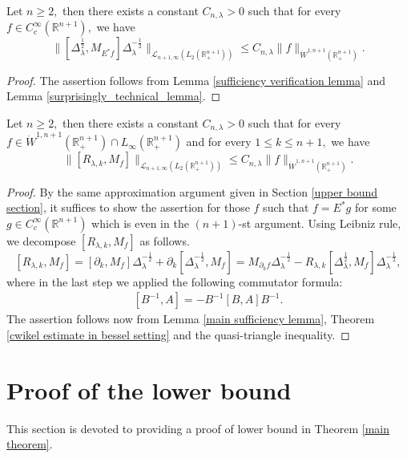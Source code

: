 \documentclass[12pt]{amsart}
\begin{document}
\begin{lemma}\label{main sufficiency lemma} Let $n\geq 2,$ then there exists a constant $C_{n,\lambda}>0$ such that for every $f\in C^{\infty}_c(\mathbb{R}^{n+1}),$ we have
$$\|[\Delta_\lambda^{\frac12},M_{E^*f}]\Delta_\lambda^{-\frac12}\|_{\mathcal{L}_{n+1,\infty}(L_2(\mathbb{R}_+^{n+1}))}\leq C_{n,\lambda}\|f\|_{\dot{W}^{1,n+1}(\mathbb{R}_+^{n+1})}.$$
\end{lemma}
\begin{proof} The assertion follows from Lemma \ref{sufficiency verification lemma} and Lemma \ref{surprisingly_technical_lemma}.
\end{proof}


\begin{proposition}\label{final sufficiency lemma} Let $n\geq 2,$ then there exists a constant $C_{n,\lambda}>0$ such that for every $f\in  \dot{W}^{1,n+1}(\mathbb{R}_+^{n+1})\cap L_{\infty}(\mathbb{R}_+^{n+1})$ and for every $1\leq k\leq n+1,$ we have
$$\|[R_{\lambda,k},M_f]\|_{\mathcal{L}_{n+1,\infty}(L_2(\mathbb{R}_+^{n+1}))}\leq C_{n,\lambda}\|f\|_{\dot{W}^{1,n+1}(\mathbb{R}_+^{n+1})}.$$
\end{proposition}
\begin{proof}
By the same approximation argument given in Section \ref{upper bound section}, it suffices to show the assertion for those $f$ such that $f=E^{\ast}g$ for some $g\in C_c^\infty(\mathbb{R}^{n+1})$ which is even in the $(n+1)$-st argument. Using Leibniz rule, we decompose $[R_{\lambda,k},M_f]$ as follows.
$$[R_{\lambda,k},M_f]=[\partial_k,M_f]\Delta_\lambda^{-\frac12}+\partial_k[\Delta_\lambda^{-\frac12},M_f]=M_{\partial_k f}\Delta_\lambda^{-\frac12}-R_{\lambda,k}[\Delta_\lambda^{\frac12},M_f]\Delta_\lambda^{-\frac12},$$
where in the last step we applied the following commutator formula:
\begin{align}\label{commutator}
[B^{-1},A]=-B^{-1}[B,A]B^{-1}.
\end{align}
The assertion follows now from Lemma \ref{main sufficiency lemma}, Theorem \ref{cwikel estimate in bessel setting} and the quasi-triangle inequality.
\end{proof}

\section{Proof of the lower bound}\label{lowbd}
\setcounter{equation}{0}
This section is devoted to providing a proof of lower bound in Theorem \ref{main theorem}.
\end{document}

